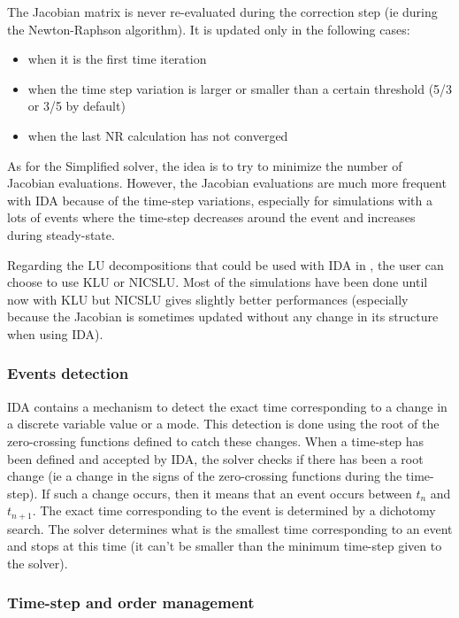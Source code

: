 \documentclass[a4paper, 12pt]{report}
\begin{document}
The Jacobian matrix is never re-evaluated during the correction step (ie during the Newton-Raphson algorithm). It is updated only in the following cases:
\begin{itemize}
\item when it is the first time iteration
\item when the time step variation is larger or smaller than a certain threshold (5/3 or 3/5 by default)
\item when the last \ac{NR} calculation has not converged
\end{itemize}
As for the Simplified solver, the idea is to try to minimize the number of Jacobian evaluations. However, the Jacobian evaluations are much more frequent with IDA because of the time-step variations, especially for simulations with a lots of events where the time-step decreases around the event and increases during steady-state.

Regarding the LU decompositions that could be used with \ac{IDA} in \Dynawo , the user can choose to use KLU or NICSLU. Most of the simulations have been done until now with KLU but NICSLU gives slightly better performances (especially because the Jacobian is sometimes updated without any change in its structure when using \ac{IDA}).

\subsubsection{Events detection}

\ac{IDA} contains a mechanism to detect the exact time corresponding to a change in a discrete variable value or a mode. This detection is done using the root of the zero-crossing functions defined to catch these changes.
When a time-step has been defined and accepted by \ac{IDA}, the solver checks if there has been a root change (ie a change in the signs of the zero-crossing functions during the time-step). If such a change occurs, then it means that an event occurs between $t_{n}$ and $t_{n+1}$. The exact time corresponding to the event is determined by a dichotomy search.
The solver determines what is the smallest time corresponding to an event and stops at this time (it can't be smaller than the minimum time-step given to the solver).

\subsubsection{Time-step and order management}
\end{document}
